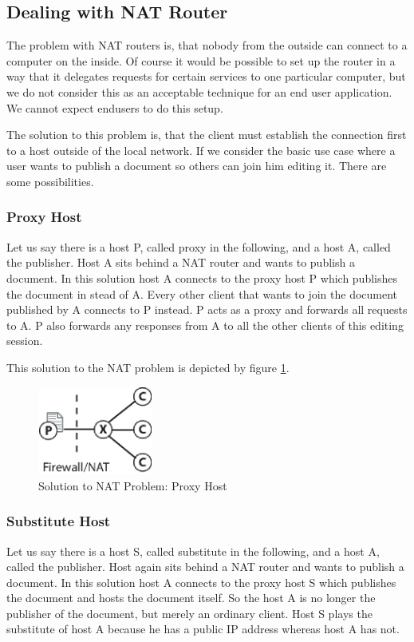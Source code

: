 \documentclass[11pt,a4paper]{article}
\begin{document}
\subsection{Dealing with NAT Router}
The problem with NAT routers is, that nobody from the outside can connect to a computer on the inside. Of course it would be possible to set up the router in a way that it delegates requests for certain services to one particular computer, but we do not consider this as an acceptable technique for an end user application. We cannot expect endusers to do this setup.

The solution to this problem is, that the client must establish the connection first to a host outside of the local network. If we consider the basic use case where a user wants to publish a document so others can join him editing it. There are some possibilities.

\subsubsection{Proxy Host}
Let us say there is a host P, called proxy in the following, and a host A, called the publisher. Host A sits behind a NAT router and wants to publish a document. In this solution host A connects to the proxy host P which publishes the document in stead of A. Every other client that wants to join the document published by A connects to P instead. P acts as a proxy and forwards all requests to A. P also forwards any responses from A to all the other clients of this editing session.

This solution to the NAT problem is depicted by figure \ref{fig:proxy}.

\begin{figure}[H]
 \centering
 \includegraphics[width=3.8cm,height=2.9cm]{../../images/net_proxy.eps}
 \caption{Solution to NAT Problem: Proxy Host}
 \label{fig:proxy}
\end{figure}

\subsubsection{Substitute Host}
Let us say there is a host S, called substitute in the following, and a host A, called the publisher. Host again sits behind a NAT router and wants to publish a document. In this solution host A connects to the proxy host S which publishes the document and hosts the document itself. So the host A is no longer the publisher of the document, but merely an ordinary client. Host S plays the substitute of host A because he has a public IP address whereas host A has not.
\end{document}
